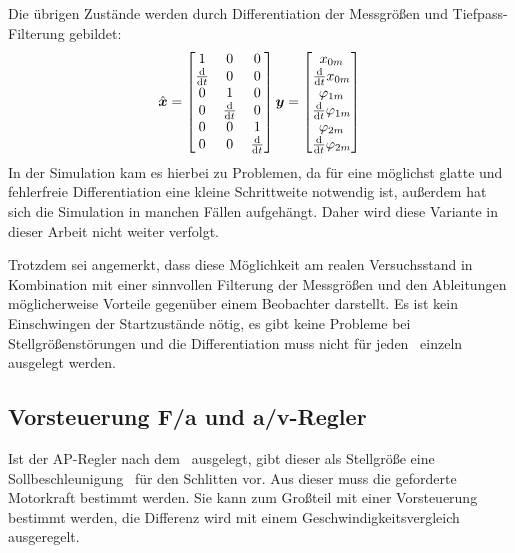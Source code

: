 \subsubsection{\diff}
Die übrigen Zustände werden durch Differentiation der Messgrößen und \evtl Tiefpass-Filterung gebildet:
\begin{align}
	\hat{\boldsymbol{x}}=\begin{bmatrix}
		1	&	0	&	0	\\
		\frac{\mathrm{d}}{\mathrm{d} t}	&	0	&	0	\\
		0	&	1	&	0	\\
		0	&	\frac{\mathrm{d}}{\mathrm{d} t}	&	0	\\
		0	&	0	&	1	\\
		0	&	0	&	\frac{\mathrm{d}}{\mathrm{d} t}	\\
	\end{bmatrix} \boldsymbol{y}  = \begin{bmatrix}
		x_{0m} \\ \frac{\mathrm{d}}{\mathrm{d} t} x_{0m} \\ \varphi_{1m} \\ \frac{\mathrm{d}}{\mathrm{d} t} \varphi_{1m} \\ \varphi_{2m} \\ \frac{\mathrm{d}}{\mathrm{d} t} \varphi_{2m}
	\end{bmatrix}
\end{align}
In der Simulation kam es hierbei zu Problemen, da für eine möglichst glatte und fehlerfreie Differentiation eine kleine Schrittweite notwendig ist, außerdem hat sich die Simulation in manchen Fällen aufgehängt. Daher wird diese Variante in dieser Arbeit nicht weiter verfolgt.

Trotzdem sei angemerkt, dass diese Möglichkeit am realen Versuchsstand in Kombination mit einer sinnvollen Filterung der Messgrößen und den Ableitungen möglicherweise Vorteile gegenüber einem Beobachter darstellt. 
Es ist kein Einschwingen der Startzustände nötig, es gibt keine Probleme bei Stellgrößenstörungen und die Differentiation muss nicht für jeden \ap\ einzeln ausgelegt werden.


\subsection{Vorsteuerung F/a und a/v-Regler}

Ist der AP-Regler nach dem \bss\ ausgelegt, gibt dieser als Stellgröße eine Sollbeschleunigung \asoll\ für den Schlitten vor. 
Aus dieser muss die geforderte Motorkraft bestimmt werden.
Sie kann zum Großteil mit einer Vorsteuerung bestimmt werden, die Differenz wird mit einem Geschwindigkeitsvergleich ausgeregelt.


